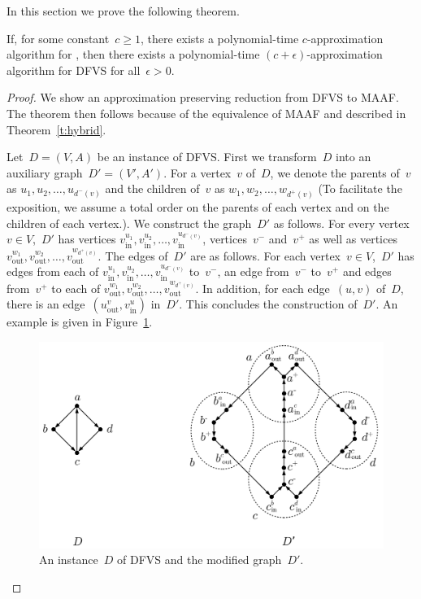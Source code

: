 In this section we prove the following theorem.

\begin{theorem}
\label{theorem:dfvsToHybrid}
If, for some constant~$c\geq 1$, there exists a polynomial-time $c$-approximation algorithm for \mh, then there exists a polynomial-time $(c+\epsilon)$-approximation algorithm for {\sc DFVS} for all~$\epsilon>0$.
\end{theorem}
\begin{proof}
We show an approximation preserving reduction from {\sc DFVS} to {\sc MAAF}. The theorem then follows because of the equivalence of MAAF and \mh described in Theorem~\ref{t:hybrid}.

Let~$D=(V,A)$ be an instance of {\sc DFVS}. First we transform~$D$ into an auxiliary graph~$D'=(V',A')$. For a vertex~$v$ of~$D$, we denote the parents of~$v$ as $u_1,u_2,\ldots,u_{d^-(v)}$ and the children of~$v$ as $w_1,w_2,\ldots,w_{d^+(v)}$ (To facilitate the exposition, we assume a total order on the parents of each vertex and on the children of each vertex.). We construct the graph~$D'$ as follows. For every vertex~$v\in V$,~$D'$ has vertices $v_{\text{in}}^{u_1},v_{\text{in}}^{u_2},\ldots,v_{\text{in}}^{u_{d^-(v)}}$, vertices~$v^-$ and~$v^+$ as well as vertices $v_{\text{out}}^{w_1},v_{\text{out}}^{w_2},\ldots,v_{\text{out}}^{w_{d^+(v)}}$. The edges of~$D'$ are as follows. For each vertex~$v\in V$,~$D'$ has edges from each of $v_{\text{in}}^{u_1},v_{\text{in}}^{u_2},\ldots,v_{\text{in}}^{u_{d^-(v)}}$ to~$v^-$, an edge from~$v^-$ to~$v^+$ and edges from~$v^+$ to each of $v_{\text{out}}^{w_1},v_{\text{out}}^{w_2},\ldots,v_{\text{out}}^{w_{d^+(v)}}$. In addition, for each edge~$(u,v)$ of~$D$, there is an 
edge~$(u_\text{out}^{v},v_\text{in}^u)$ in~$D'$. This concludes the construction of~$D'$. An example is given in Figure~\ref{fig:reduction1}.

\begin{figure}
    \centering
    \includegraphics[scale=.45]{../figs/fig_reduction1}
    \caption{An instance~$D$ of DFVS and the modified graph~$D'$.}
    \label{fig:reduction1}
\end{figure}


\end{proof}
